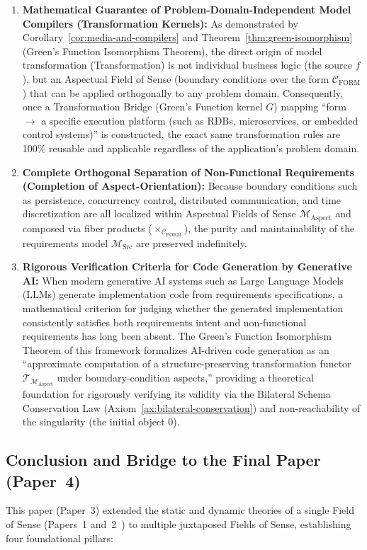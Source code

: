 \documentclass[11pt,a4paper]{article}
\theoremstyle{definition}
\theoremstyle{plain}
\theoremstyle{remark}
\newcommand{\CFORM}{\mathcal{C}_{\mathrm{FORM}}}
\newcommand{\MSrc}{\mathcal{M}_{\mathrm{Src}}}
\newcommand{\MAspect}{\mathcal{M}_{\mathrm{Aspect}}}
\begin{document}
\begin{enumerate}
    \item \textbf{Mathematical Guarantee of Problem-Domain-Independent Model Compilers (Transformation Kernels):}
    As demonstrated by Corollary~\ref{cor:media-and-compilers} and Theorem~\ref{thm:green-isomorphism} (Green's Function Isomorphism Theorem), the direct origin of model transformation (Transformation) is not individual business logic (the source $f$), but an Aspectual Field of Sense (boundary conditions over the form $\CFORM$) that can be applied orthogonally to any problem domain. Consequently, once a Transformation Bridge (Green's Function kernel $G$) mapping ``form $\to$ a specific execution platform (such as RDBs, microservices, or embedded control systems)'' is constructed, the exact same transformation rules are 100\% reusable and applicable regardless of the application's problem domain.
    \item \textbf{Complete Orthogonal Separation of Non-Functional Requirements (Completion of Aspect-Orientation):}
    Because boundary conditions such as persistence, concurrency control, distributed communication, and time discretization are all localized within Aspectual Fields of Sense $\MAspect$ and composed via fiber products ($\times_{\CFORM}$), the purity and maintainability of the requirements model $\MSrc$ are preserved indefinitely.
    \item \textbf{Rigorous Verification Criteria for Code Generation by Generative AI:}
    When modern generative AI systems such as Large Language Models (LLMs) generate implementation code from requirements specifications, a mathematical criterion for judging whether the generated implementation consistently satisfies both requirements intent and non-functional requirements has long been absent. The Green's Function Isomorphism Theorem of this framework formalizes AI-driven code generation as an ``approximate computation of a structure-preserving transformation functor $\mathcal{T}_{\MAspect}$ under boundary-condition aspects,'' providing a theoretical foundation for rigorously verifying its validity via the Bilateral Schema Conservation Law (Axiom~\ref{ax:bilateral-conservation}) and non-reachability of the singularity (the initial object $0$).
\end{enumerate}

\subsection{Conclusion and Bridge to the Final Paper (Paper~4)}
This paper (Paper~3) extended the static and dynamic theories of a single Field of Sense (Papers~1 and~2~\cite{ota2026paper1,ota2026paper2}) to multiple juxtaposed Fields of Sense, establishing four foundational pillars:
\end{document}
